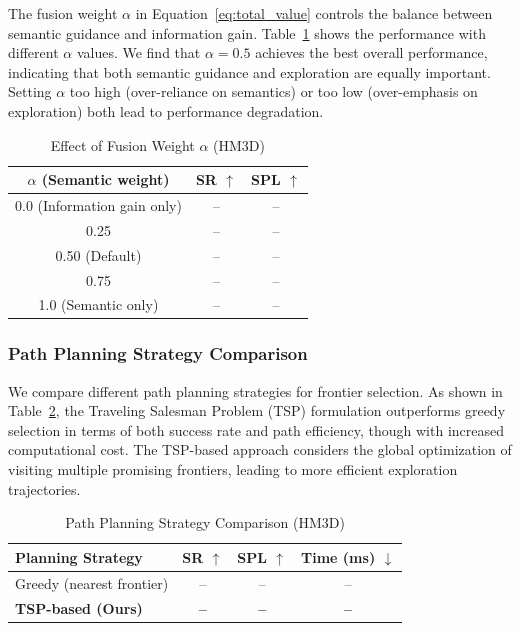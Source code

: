 \documentclass[conference]{IEEEtran}
\begin{document}
The fusion weight $\alpha$ in Equation~\ref{eq:total_value} controls the balance between semantic guidance and information gain. Table~\ref{tab:ablation_alpha} shows the performance with different $\alpha$ values. We find that $\alpha=0.5$ achieves the best overall performance, indicating that both semantic guidance and exploration are equally important. Setting $\alpha$ too high (over-reliance on semantics) or too low (over-emphasis on exploration) both lead to performance degradation.

\begin{table}[t]
\centering
\caption{Effect of Fusion Weight $\alpha$ (HM3D)}
\label{tab:ablation_alpha}
\begin{tabular}{c|cc}
\toprule
$\alpha$ (Semantic weight) & SR $\uparrow$ & SPL $\uparrow$ \\
\midrule
0.0 (Information gain only) & -- & -- \\
0.25 & -- & -- \\
0.50 (Default) & -- & -- \\
0.75 & -- & -- \\
1.0 (Semantic only) & -- & -- \\
\bottomrule
\end{tabular}
\end{table}

\subsubsection{Path Planning Strategy Comparison}

We compare different path planning strategies for frontier selection. As shown in Table~\ref{tab:ablation_path}, the Traveling Salesman Problem (TSP) formulation outperforms greedy selection in terms of both success rate and path efficiency, though with increased computational cost. The TSP-based approach considers the global optimization of visiting multiple promising frontiers, leading to more efficient exploration trajectories.

\begin{table}[t]
\centering
\caption{Path Planning Strategy Comparison (HM3D)}
\label{tab:ablation_path}
\begin{tabular}{l|cc|c}
\toprule
Planning Strategy & SR $\uparrow$ & SPL $\uparrow$ & Time (ms) $\downarrow$ \\
\midrule
Greedy (nearest frontier) & -- & -- & -- \\
\textbf{TSP-based (Ours)} & \textbf{--} & \textbf{--} & \textbf{--} \\
\bottomrule
\end{tabular}
\end{table}
\end{document}
